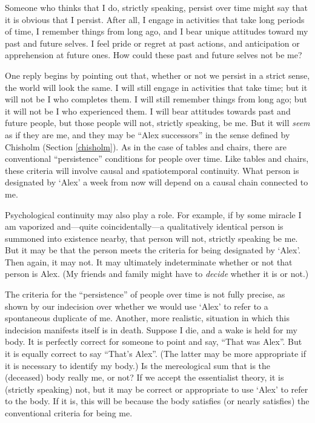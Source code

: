 \documentclass[12pt,twoside]{reedfancy}
\begin{document}
\begin{spacing}{1.25}
Someone who thinks that I do, strictly speaking, persist over time
might say that it is obvious that I persist.  After all, I engage in
activities that take long periods of time, I remember things from long
ago, and I bear unique attitudes toward my past and future selves.  I
feel pride or regret at past actions, and anticipation or apprehension
at future ones.  How could these past and future selves not be me?

One reply begins by pointing out that, whether or not we persist in a
strict sense, the world will look the same.  I will still engage in
activities that take time; but it will not be I who completes them.  I
will still remember things from long ago; but it will not be I who
experienced them.  I will bear attitudes towards past and future
people, but those people will not, strictly speaking, be me.  But it
will {\em seem} as if they are me, and they may be ``Alex successors''
in the sense defined by Chisholm (Section \ref{chisholm}).  As in the
case of tables and chairs, there are conventional ``persistence''
conditions for people over time.  Like tables and chairs, these
criteria will involve causal and spatiotemporal continuity.  What
person is designated by `Alex' a week from now will depend on a causal
chain connected to me.

Psychological continuity may also play a role.  For example, if by
some miracle I am vaporized and---quite coincidentally---a
qualitatively identical person is summoned into existence nearby, that
person will not, strictly speaking be me.  But it may be that the
person meets the criteria for being designated by `Alex'.  Then again,
it may not.  It may ultimately indeterminate whether or not that
person is Alex.  (My friends and family might have to {\em decide}
whether it is or not.)

The criteria for the ``persistence'' of people over time is not fully
precise, as shown by our indecision over whether we would use `Alex'
to refer to a spontaneous duplicate of me.  Another, more realistic,
situation in which this indecision manifests itself is in death.
Suppose I die, and a wake is held for my body.  It is perfectly
correct for someone to point and say, ``That was Alex''.  But it is
equally correct to say ``That's Alex''.  (The latter may be more
appropriate if it is necessary to identify my body.)  Is the
mereological sum that is the (deceased) body really me, or not?  If we
accept the essentialist theory, it is (strictly speaking) not, but it
may be correct or appropriate to use `Alex' to refer to the body.  If
it is, this will be because the body satisfies (or nearly satisfies)
the conventional criteria for being me.


\end{spacing}
\end{document}
